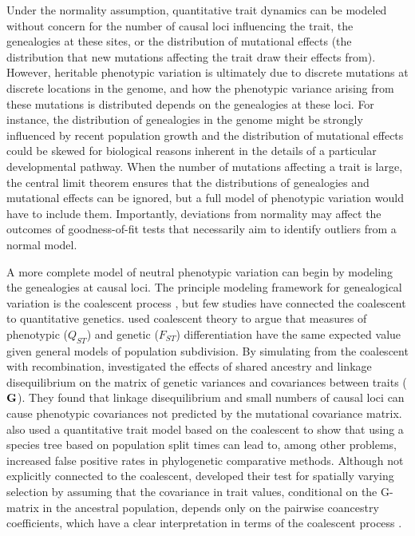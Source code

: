 Under the normality assumption, quantitative trait dynamics can be modeled
without concern for the number of causal loci influencing the trait, the
genealogies at these sites, or the distribution of mutational effects (the
distribution that new mutations affecting the trait draw their effects from).
However, heritable phenotypic variation is ultimately due to discrete mutations
at discrete locations in the genome, and how the phenotypic variance arising
from these mutations is distributed depends on the genealogies at these loci.
For instance, the distribution of genealogies in the genome might be strongly
influenced by recent population growth and the distribution of mutational
effects could be skewed for biological reasons inherent in the details of a
particular developmental pathway. When the number of mutations affecting a trait
is large, the central limit theorem ensures that the distributions of
genealogies and mutational effects can be ignored, but a full model of
phenotypic variation would have to include them. Importantly, deviations from
normality may affect the outcomes of goodness-of-fit tests that necessarily aim
to identify outliers from a normal model.

A more complete model of neutral phenotypic variation can begin by modeling the
genealogies at causal loci. The principle modeling framework for genealogical
variation is the coalescent process \citep{Wakeley2008}, but few studies have
connected the coalescent to quantitative genetics. \citet{Whitlock1999} used
coalescent theory to argue that measures of phenotypic ($Q_{ST}$) and genetic
($F_{ST}$) differentiation have the same expected value given general models of
population subdivision. By simulating from the coalescent with recombination,
\citet{Griswold2007} investigated the effects of shared ancestry and linkage
disequilibrium on the matrix of genetic variances and covariances between traits
($\mbox{\textbf{G}}$). They found that linkage disequilibrium and small numbers
of causal loci can cause phenotypic covariances not predicted by the mutational
covariance matrix. \citet{Mendes2018} also used a quantitative trait model based
on the coalescent to show that using a species tree based on population split
times can lead to, among other problems, increased false positive rates in
phylogenetic comparative methods. Although not explicitly connected to the
coalescent, \citet{Ovaskainen2011} developed their test for spatially varying
selection by assuming that the covariance in trait values, conditional on the
G-matrix in the ancestral population, depends only on the pairwise coancestry
coefficients, which have a clear interpretation in terms of the coalescent
process \citep{Slatkin1991}.

